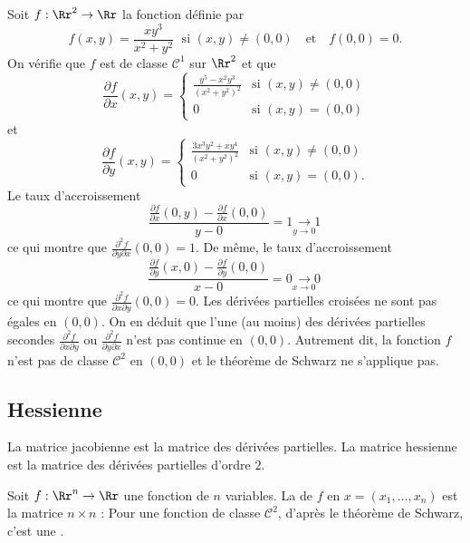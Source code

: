 \begin{exemple}{}{}
Soit $f: \Rr^2 \to \Rr$ la fonction définie par
$$f(x,y)=\frac{xy^3}{x^2+y^2}\;\mbox{ si }(x,y)\neq (0,0)\quad \mbox{et}\quad f(0,0)= 0.$$
On vérifie que $f$ est de classe $\mathcal{C}^1$ sur $\Rr^2$ et que
$$\frac{\partial f}{\partial x}(x,y)=\left\{\begin{array}{cl}\displaystyle \frac{y^5-x^2y^3}{(x^2+y^2)^2}&\mbox{si }(x,y)\neq (0,0)\\ 0&\mbox{si }(x,y)=(0,0)
\end{array}\right.$$
et 
$$\frac{\partial f}{\partial y}(x,y)=\left\{\begin{array}{cl}\displaystyle \frac{3x^3y^2+xy^4}{(x^2+y^2)^2}&\mbox{si }(x,y)\neq (0,0)\\ 0&\mbox{si }(x,y)=(0,0).\end{array}\right.$$
Le taux d'accroissement
$$\frac{\frac{\partial f}{\partial x}(0,y)-\frac{\partial f}{\partial x}(0,0)}{y-0}=1\underset{y\to 0\; \; \; }{\longrightarrow 1}$$
ce qui montre que $\displaystyle \frac{\partial ^2f}{\partial y\partial x}(0,0)=1$.
De même, le taux d'accroissement
$$\frac{\frac{\partial f}{\partial y}(x,0)-\frac{\partial f}{\partial y}(0,0)}{x-0}=0\underset{x\to 0\; \; \; }{\longrightarrow 0}$$
ce qui montre que $\displaystyle \frac{\partial ^2f}{\partial x\partial y}(0,0)=0$. 
Les dérivées partielles croisées ne sont pas égales en $(0,0)$.
On en déduit que l'une (au moins) des dérivées partielles secondes $\displaystyle \frac{\partial ^2f}{\partial x\partial y}$ ou $\displaystyle \frac{\partial ^2f}{\partial y\partial x}$ n'est pas continue en $(0,0)$. Autrement dit, la fonction $f$ n'est pas de classe $\mathcal{C}^2$ en $(0,0)$ et le théorème de Schwarz ne s'applique pas.
\end{exemple}


\subsection{Hessienne}

La matrice jacobienne est la matrice des dérivées partielles.
La matrice hessienne est la matrice des dérivées partielles d'ordre $2$.

Soit $f : \Rr^n \to \Rr$ une fonction de $n$ variables.
La  de $f$ en $x=(x_1,\ldots,x_n)$ est la matrice $n \times n$ :
Pour une fonction de classe $\mathcal{C}^2$, d'après le théorème de Schwarz, c'est une .



